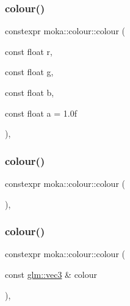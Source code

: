 \mbox{\label{classmoka_1_1colour_a0b699c63f210e7965fab183a3bbf74b4}} 
\subsubsection{\texorpdfstring{colour()}{colour()}\hspace{0.1cm}{\footnotesize\ttfamily [3/6]}}
{\footnotesize\ttfamily constexpr moka\+::colour\+::colour (\begin{DoxyParamCaption}\item[{const float}]{r,  }\item[{const float}]{g,  }\item[{const float}]{b,  }\item[{const float}]{a = {\ttfamily 1.0f} }\end{DoxyParamCaption})\hspace{0.3cm}{\ttfamily [inline]}, {\ttfamily [noexcept]}}

\mbox{\label{classmoka_1_1colour_ad09262ca992f6ce84ea945b5efedffe0}} 
\subsubsection{\texorpdfstring{colour()}{colour()}\hspace{0.1cm}{\footnotesize\ttfamily [4/6]}}
{\footnotesize\ttfamily constexpr moka\+::colour\+::colour (\begin{DoxyParamCaption}{ }\end{DoxyParamCaption})\hspace{0.3cm}{\ttfamily [inline]}, {\ttfamily [noexcept]}}

\mbox{\label{classmoka_1_1colour_ad01b6d1af210de8289c0add5a3d1be04}} 
\subsubsection{\texorpdfstring{colour()}{colour()}\hspace{0.1cm}{\footnotesize\ttfamily [5/6]}}
{\footnotesize\ttfamily constexpr moka\+::colour\+::colour (\begin{DoxyParamCaption}\item[{const \mbox{\hyperlink{namespacemoka_aed2224bc0e5b79e57a8975ded94ee1aaa97ade28e93c0de60adc075bdbe07ca36}{glm\+::vec3}} \&}]{colour }\end{DoxyParamCaption})\hspace{0.3cm}{\ttfamily [inline]}, {\ttfamily [noexcept]}}

